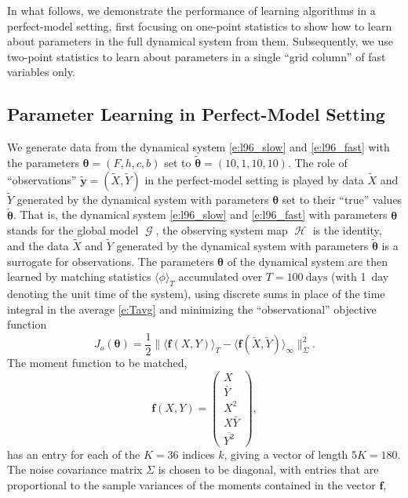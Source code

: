 \documentclass[draft]{agujournal}
\renewcommand{\vec}[1]{\boldsymbol{{#1}}}
\newcommand{\cH}{\mathop{\mathcal{H}}}
\newcommand{\cG}{\mathop{\mathcal{G}}}
\begin{document}
In what follows, we demonstrate the performance of learning algorithms in a perfect-model setting, first focusing on one-point statistics to show how to learn about parameters in the full dynamical system from them. Subsequently, we use two-point statistics to learn about parameters in a single ``grid column'' of fast variables only.

\subsection{Parameter Learning in Perfect-Model Setting}

We generate data from the dynamical system \eqref{e:l96_slow} and \eqref{e:l96_fast} with the parameters $\vec{\theta} = (F, h, c, b)$ set to $\vec{\tilde\theta} = (10, 1, 10, 10)$. The role of ``observations'' $\vec{\tilde y} = (\tilde X, \tilde Y)$ in the perfect-model setting is played by data $\tilde X$ and $\tilde Y$ generated by the dynamical system with parameters $\vec{\theta}$ set to their ``true'' values $\vec{\tilde\theta}$. That is, the dynamical system \eqref{e:l96_slow} and \eqref{e:l96_fast} with parameters $\vec{\theta}$ stands for the global model $\cG$, the observing system map $\cH$ is the identity, and the data $\tilde X$ and $\tilde Y$ generated by the dynamical system with parameters $\vec{\tilde \theta}$ is a surrogate for observations. The parameters $\vec{\theta}$ of the dynamical system are then learned by matching statistics $\langle \phi \rangle_T$ accumulated over $T = 100~\mathrm{days}$ (with 1~day denoting the unit time of the system),  using discrete sums in place of the time integral in the average \eqref{e:Tavg} and minimizing the ``observational'' objective function 
\begin{equation}\label{e:obj_o1}
J_o(\vec{\theta})=\frac12\| \langle \vec{f}(X, Y)  \rangle_T - \langle \vec{f}(\tilde X, \tilde Y)
\rangle_\infty \|_{\Sigma}^2.
\end{equation}
The moment function to be matched,
\begin{equation}
\vec{f}(X, Y) = \left( 
\begin{array}{c} 
X\\
\bar Y\\
X^2\\
X\bar Y\\
\overline{Y^2}
\end{array}
\right),
\end{equation}
has an entry for each of the $K=36$ indices $k$, giving a vector of length $5K =180$. The noise covariance matrix $\Sigma$ is chosen to be diagonal, with entries that are proportional to the sample variances of the moments contained in the vector $\vec{f}$,
\end{document}
